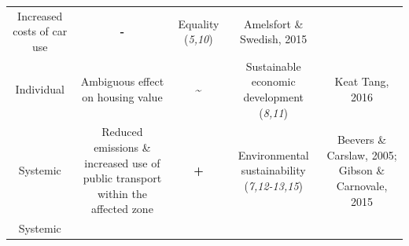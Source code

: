 \documentclass[
]{book}
\begin{document}
\begin{longtable}[]{@{}ccccc@{}}
\begin{minipage}[t]{0.16\columnwidth}
Increased costs of car use\strut
\end{minipage} & \begin{minipage}[t]{0.17\columnwidth}\centering
\textbf{-}\strut
\end{minipage} & \begin{minipage}[t]{0.17\columnwidth}\centering
Equality (\emph{5,10})\strut
\end{minipage} & \begin{minipage}[t]{0.17\columnwidth}\centering
Amelsfort \& Swedish, 2015\strut
\end{minipage}\tabularnewline
\begin{minipage}[t]{0.17\columnwidth}\centering
Individual\strut
\end{minipage} & \begin{minipage}[t]{0.16\columnwidth}\centering
Ambiguous effect on housing value\strut
\end{minipage} & \begin{minipage}[t]{0.17\columnwidth}\centering
\textbf{\textasciitilde{}}\strut
\end{minipage} & \begin{minipage}[t]{0.17\columnwidth}\centering
Sustainable economic development (\emph{8,11})\strut
\end{minipage} & \begin{minipage}[t]{0.17\columnwidth}\centering
Keat Tang, 2016\strut
\end{minipage}\tabularnewline
\begin{minipage}[t]{0.17\columnwidth}\centering
Systemic\strut
\end{minipage} & \begin{minipage}[t]{0.16\columnwidth}\centering
Reduced emissions \& increased use of public transport within the affected zone\strut
\end{minipage} & \begin{minipage}[t]{0.17\columnwidth}\centering
\textbf{+}\strut
\end{minipage} & \begin{minipage}[t]{0.17\columnwidth}\centering
Environmental sustainability (\emph{7,12-13,15})\strut
\end{minipage} & \begin{minipage}[t]{0.17\columnwidth}\centering
Beevers \& Carslaw, 2005; Gibson \& Carnovale, 2015\strut
\end{minipage}\tabularnewline
\begin{minipage}[t]{0.17\columnwidth}\centering
Systemic\strut
\end{minipage} & \begin{minipage}[t]{0.16\columnwidth}\centering

\end{minipage}
\end{longtable}
\end{document}
